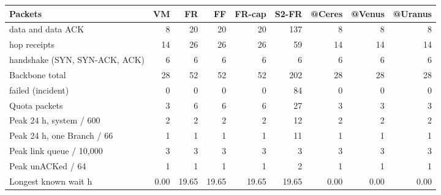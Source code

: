 \medskip
\par\noindent
\begin{tabular}{lrrrrrrrr}
\toprule
Packets & VM & FR & FF & FR-cap & S2-FR & @Ceres & @Venus & @Uranus\\
\midrule
data and data ACK & 8 & 20 & 20 & 20 & 137 & 8 & 8 & 8\\
hop receipts & 14 & 26 & 26 & 26 & 59 & 14 & 14 & 14\\
handshake (SYN, SYN-ACK, ACK) & 6 & 6 & 6 & 6 & 6 & 6 & 6 & 6\\
Backbone total & 28 & 52 & 52 & 52 & 202 & 28 & 28 & 28\\
failed (incident) & 0 & 0 & 0 & 0 & 84 & 0 & 0 & 0\\
Quota packets & 3 & 6 & 6 & 6 & 27 & 3 & 3 & 3\\
Peak 24 h, system / 600 & 2 & 2 & 2 & 2 & 12 & 2 & 2 & 2\\
Peak 24 h, one Branch / 66 & 1 & 1 & 1 & 1 & 11 & 1 & 1 & 1\\
Peak link queue / 10{,}000 & 3 & 3 & 3 & 3 & 3 & 3 & 3 & 3\\
Peak unACKed / 64 & 1 & 1 & 1 & 1 & 2 & 1 & 1 & 1\\
Longest known wait h & 0.00 & 19.65 & 19.65 & 19.65 & 19.65 & 0.00 & 0.00 & 0.00\\
\bottomrule
\end{tabular}\par
